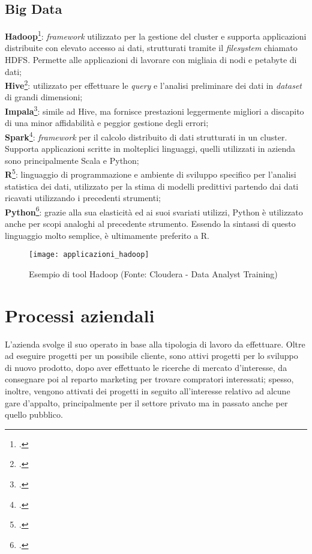 \subsection{Big Data}
\textbf{Hadoop}\footcite{https://hadoop.apache.org/}: \textit{framework} utilizzato per la gestione del \gls{cluster} e supporta applicazioni distribuite con elevato accesso ai dati, strutturati tramite il \textit{filesystem} chiamato \gls{HDFS}. Permette alle applicazioni di lavorare con migliaia di nodi e petabyte di dati;\\
\textbf{Hive}\footcite{https://hive.apache.org/}: utilizzato per effettuare le \textit{query} e l'analisi preliminare dei dati in \textit{dataset} di grandi dimensioni;\\
\textbf{Impala}\footcite{https://impala.apache.org/}: simile ad Hive, ma fornisce prestazioni leggermente migliori a discapito di una minor affidabilità e peggior gestione degli errori; \\
\textbf{Spark}\footcite{https://spark.apache.org/}: \textit{framework} per il calcolo distribuito di dati strutturati in un \gls{cluster}. Supporta applicazioni scritte in molteplici linguaggi, quelli utilizzati in azienda sono principalmente Scala e Python;\\
\textbf{R}\footcite{https://www.r-project.org/}: linguaggio di programmazione e ambiente di sviluppo specifico per l'analisi statistica dei dati, utilizzato per la stima di modelli predittivi partendo dai dati ricavati utilizzando i precedenti strumenti;\\
\textbf{Python}\footcite{https://www.python.org/}: grazie alla sua elasticità ed ai suoi svariati utilizzi, Python è utilizzato anche per scopi analoghi al precedente strumento. Essendo la sintassi di questo linguaggio molto semplice, è ultimamente preferito a R.\\
\begin{figure}[!h] 
	\centering 
	\texttt{[image: applicazioni\_hadoop]} 
	\caption{Esempio di tool Hadoop (Fonte: Cloudera - Data Analyst Training)}
\end{figure}

\newpage
\section{Processi aziendali}

L'azienda svolge il suo operato in base alla tipologia di lavoro da effettuare. Oltre ad eseguire progetti per un possibile cliente, sono attivi progetti per lo sviluppo di nuovo prodotto, dopo aver effettuato le ricerche di mercato d'interesse, da consegnare poi al reparto marketing per trovare compratori interessati; spesso, inoltre, vengono attivati dei progetti in seguito all'interesse relativo ad alcune gare d'appalto, principalmente per il settore privato ma in passato anche per quello pubblico.


